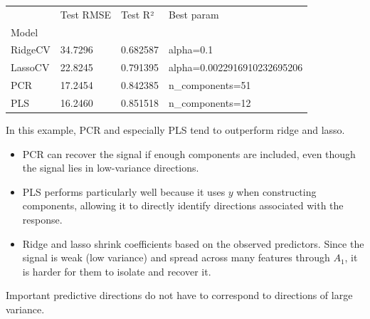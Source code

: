 \documentclass[
  letterpaper,
  DIV=11,
  numbers=noendperiod]{scrreprt}
\newcounter{none} %
\providecommand{\tightlist}{%
  \setlength{\itemsep}{0pt}\setlength{\parskip}{0pt}}
\theoremstyle{definition}
\theoremstyle{definition}
\theoremstyle{plain}
\theoremstyle{plain}
\theoremstyle{remark}
\begin{document}
{\def\LTcaptype{none} %
\begin{longtable}[]{@{}llll@{}}
\toprule\noalign{}
& Test RMSE & Test R² & Best param \\
Model & & & \\
\midrule\noalign{}
\endhead
\bottomrule\noalign{}
\endlastfoot
RidgeCV & 34.7296 & 0.682587 & alpha=0.1 \\
LassoCV & 22.8245 & 0.791395 & alpha=0.0022916910232695206 \\
PCR & 17.2454 & 0.842385 & n\_components=51 \\
PLS & 16.2460 & 0.851518 & n\_components=12 \\
\end{longtable}
}

In this example, PCR and especially PLS tend to outperform ridge and
lasso.

\begin{itemize}
\tightlist
\item
  PCR can recover the signal if enough components are included, even
  though the signal lies in low-variance directions.
\item
  PLS performs particularly well because it uses \(y\) when constructing
  components, allowing it to directly identify directions associated
  with the response.
\item
  Ridge and lasso shrink coefficients based on the observed predictors.
  Since the signal is weak (low variance) and spread across many
  features through \(A_1\), it is harder for them to isolate and recover
  it.
\end{itemize}

\begin{tcolorbox}[enhanced jigsaw, arc=.35mm, bottomrule=.15mm, bottomtitle=1mm, breakable, colback=white, colbacktitle=quarto-callout-caution-color!10!white, colframe=quarto-callout-caution-color-frame, coltitle=black, left=2mm, leftrule=.75mm, opacityback=0, opacitybacktitle=0.6, rightrule=.15mm, title=\textcolor{quarto-callout-caution-color}{\faFire}\hspace{0.5em}{Caution}, titlerule=0mm, toprule=.15mm, toptitle=1mm]

Important predictive directions do not have to correspond to directions
of large variance.

\end{tcolorbox}

\cleardoublepage
{}
{}
\appendix
\end{document}
